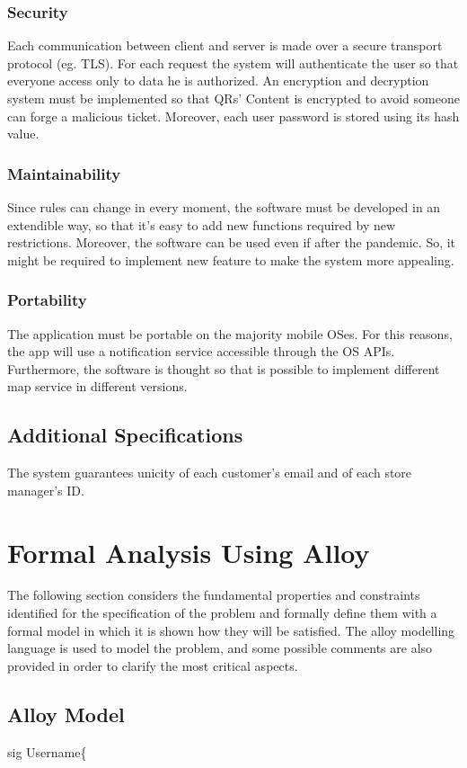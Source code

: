 \documentclass{article}
\begin{document}
		\subsubsection{Security}
		Each communication between client and server is made over a secure transport protocol (eg. TLS). For each request the system will authenticate the user so that everyone access only to data he is authorized. An encryption and decryption system must be implemented so that QRs' Content is encrypted to avoid someone can forge a malicious ticket. Moreover, each user password is stored using its hash value. 
		\subsubsection{Maintainability}
		Since rules can change in every moment, the software must be developed in an extendible way, so that it's easy to add new functions required by new restrictions. Moreover, the software can be used even if after the pandemic. So, it might be required to implement new feature to make the system more appealing.
		\subsubsection{Portability}
		The application must be portable on the majority mobile OSes. For this reasons, the app will use a notification service accessible through the OS APIs. Furthermore, the software is thought so that is possible to implement different map service in different versions.
		\subsection{Additional Specifications}
	The system guarantees unicity of each customer's email and of each store manager's ID.
	
	\newpage
	
\section{Formal Analysis Using Alloy}
	The following section considers the fundamental properties and constraints identified for the specification of the problem and formally define them with a formal model in which it is shown how they will be satisfied. The alloy modelling language is used to model the problem, and some possible comments are also provided in order to clarify the most critical aspects. 
	\subsection{Alloy Model}
	sig Username\{
	
\end{document}
